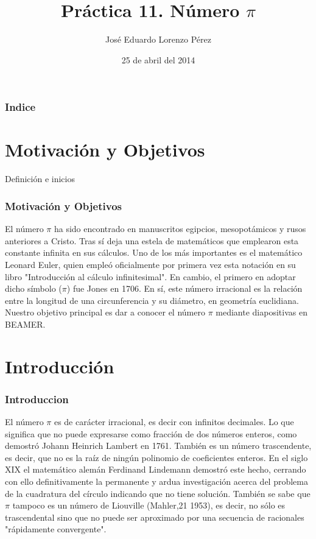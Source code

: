 \documentclass{beamer}
\title[El número $\pi$]{Práctica 11. Número $\pi$}
\author[alu0100831603]{José Eduardo Lorenzo Pérez}
\institute{ULL.Facult.Matem}
\date[25/04/2014]{25 de abril del 2014}
\begin{document}
\begin{frame}
\titlepage
\end{frame}

\begin{frame}
\frametitle{Indice}
\tableofcontents
\end{frame}

\section{Motivación y Objetivos}
\begin{frame}
\begin{block}{Definición e inicios}
\frametitle{Motivación y Objetivos}
El número $\pi$ ha sido encontrado en manuscritos egipcios, mesopotámicos y rusos anteriores a Cristo. Tras sí deja una estela de matemáticos que emplearon esta constante infinita en sus cálculos. Uno de los más importantes es el matemático Leonard Euler, quien empleó oficialmente por primera vez esta notación en su libro "Introducción al cálculo infinitesimal". En cambio, el primero en adoptar dicho símbolo ($\pi$) fue Jones en 1706.
%
En sí, este número irracional es la relación entre la longitud de una circunferencia y su diámetro, en geometría euclidiana.
%
Nuestro objetivo principal es dar a conocer el número $\pi$ mediante diapositivas en BEAMER.
\end{block}
\end{frame}
%
\section{Introducción}

\begin{frame}
\frametitle{Introduccion}

El número $\pi$ es de carácter irracional, es decir con infinitos decimales. Lo que significa que no puede expresarse como fracción de dos números enteros, como demostró Johann Heinrich Lambert en 1761. También es un número trascendente, es decir, que no es la raíz de ningún polinomio de coeficientes enteros. En el siglo XIX el matemático alemán Ferdinand Lindemann demostró este hecho, cerrando con ello definitivamente la permanente y ardua investigación acerca del problema de la cuadratura del círculo indicando que no tiene solución.
También se sabe que $\pi$ tampoco es un número de Liouville (Mahler,21 1953), es decir, no sólo es trascendental sino que no puede ser aproximado por una secuencia de racionales "rápidamente convergente".
%


\end{frame}
\end{document}
